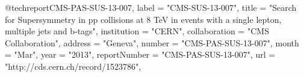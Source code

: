 @techreport{CMS-PAS-SUS-13-007,
      label          = "CMS-SUS-13-007",
      title         = "{Search for Supersymmetry in pp collisions at 8 TeV in
                       events with a single lepton, multiple jets and b-tags}",
      institution   = "CERN",
      collaboration = "CMS Collaboration",
      address       = "Geneva",
      number        = "CMS-PAS-SUS-13-007",
      month         = "Mar",
      year          = "2013",
      reportNumber  = "CMS-PAS-SUS-13-007",
      url           = "http://cds.cern.ch/record/1523786",
}

